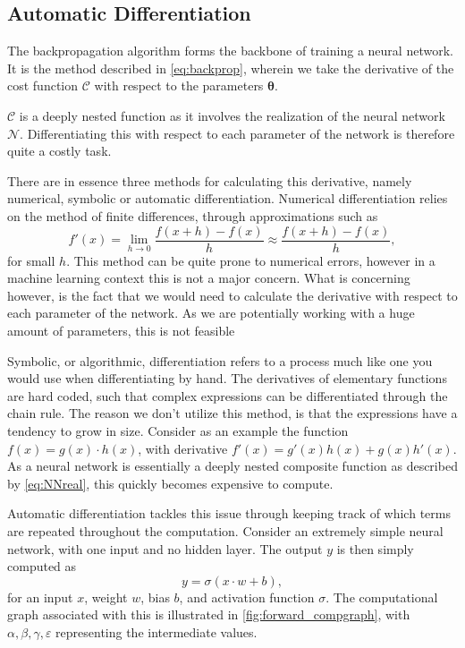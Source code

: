 \subsection{Automatic Differentiation}\label{sec:autodiff}
The backpropagation algorithm \cite{Backpropogation1986} forms the backbone of training a neural network.
It is the method described in \eqref{eq:backprop}, wherein we take the derivative of the cost function $\mathcal{C}$ with respect to the parameters $\boldsymbol{\theta}$.

$\mathcal{C}$ is a deeply nested function as it involves the realization of the neural network $\mathcal{N}$.
Differentiating this with respect to each parameter of the network is therefore quite a costly task.

There are in essence three methods for calculating this derivative, namely numerical, symbolic or automatic differentiation.
Numerical differentiation relies on the method of finite differences, through approximations such as
\begin{equation}
    f'(x) = \lim_{h \to 0} \frac{f(x+h) - f(x)}{h} \approx \frac{f(x + h) - f(x)}{h},
\end{equation}
for small $h$.
This method can be quite prone to numerical errors, however in a machine learning context this is not a major concern.
What is concerning however, is the fact that we would need to calculate the derivative with respect to each parameter of the network.
As we are potentially working with a huge amount of parameters, this is not feasible

Symbolic, or algorithmic, differentiation refers to a process much like one you would use when differentiating by hand.
The derivatives of elementary functions are hard coded, such that complex expressions can be differentiated through the chain rule.
The reason we don't utilize this method, is that the expressions have a tendency to grow in size.
Consider as an example the function $f(x) = g(x) \cdot h(x)$,
with derivative $f'(x) = g'(x) h(x) + g(x) h'(x)$.
As a neural network is essentially a deeply nested composite function as described by \eqref{eq:NNreal}, this quickly becomes expensive to compute.

Automatic differentiation tackles this issue through keeping track of which terms are repeated throughout the computation.
Consider an extremely simple neural network, with one input and no hidden layer.
The output $y$ is then simply computed as
\begin{equation}\label{eq:supersimple_NN}
    y = \sigma \left( x \cdot w + b \right),
\end{equation}
for an input $x$, weight $w$, bias $b$, and activation function $\sigma$.
The computational graph associated with this is illustrated in \autoref{fig:forward_compgraph}, with $\alpha, \beta, \gamma, \varepsilon$ representing the intermediate values.

